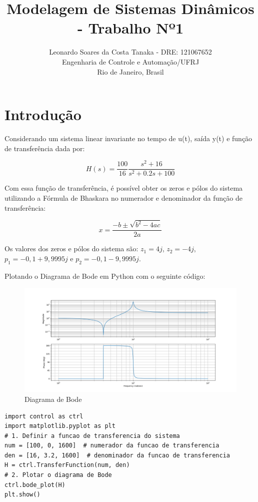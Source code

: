 \documentclass[10pt]{article}
\title{Modelagem de Sistemas Dinâmicos - Trabalho Nº1}
\author{
    Leonardo Soares da Costa Tanaka - DRE: 121067652 \\
    Engenharia de Controle e Automação/UFRJ \\
    Rio de Janeiro, Brasil
}
\date{}
\begin{document}
\maketitle
\thispagestyle{capa}

\section{Introdução}

\quad Considerando um sistema linear invariante no tempo de u(t), saída y(t) e 
função de transferência dada por:

\begin{equation}
    H(s) = \frac{100}{16} \frac{s^2 + 16}{s^2 + 0.2s + 100}
\end{equation}

\quad Com essa função de transferência,
é possível obter os zeros e pólos do sistema utilizando a Fórmula de Bhaskara no numerador e denominador da função de transferência:

\begin{equation}
    x = \frac{-b \pm \sqrt{b^2 - 4ac}}{2a}
\end{equation}

\quad Os valores dos zeros e pólos do sistema são:
$z_1 = 4j$, $z_2 = -4j$, $p_1 = -0,1 + 9,9995j$ e $p_2 = -0,1 - 9,9995j$.

\quad Plotando o Diagrama de Bode em Python com o seguinte código:

\begin{figure}[h]
    \centering
    \includegraphics[scale=0.4]{bode.png}
    \caption{Diagrama de Bode}
\end{figure}

\begin{lstlisting}
import control as ctrl
import matplotlib.pyplot as plt
# 1. Definir a funcao de transferencia do sistema
num = [100, 0, 1600]  # numerador da funcao de transferencia
den = [16, 3.2, 1600]  # denominador da funcao de transferencia
H = ctrl.TransferFunction(num, den)
# 2. Plotar o diagrama de Bode
ctrl.bode_plot(H)
plt.show()    
\end{lstlisting}
\end{document}
